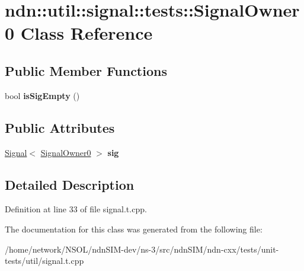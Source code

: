 \hypertarget{classndn_1_1util_1_1signal_1_1tests_1_1SignalOwner0}{}\section{ndn\+:\+:util\+:\+:signal\+:\+:tests\+:\+:Signal\+Owner0 Class Reference}
\label{classndn_1_1util_1_1signal_1_1tests_1_1SignalOwner0}
\subsection*{Public Member Functions}
\begin{DoxyCompactItemize}
\item 
bool {\bfseries is\+Sig\+Empty} ()\hypertarget{classndn_1_1util_1_1signal_1_1tests_1_1SignalOwner0_a130d53832145802ab6fde4f255c1432b}{}\label{classndn_1_1util_1_1signal_1_1tests_1_1SignalOwner0_a130d53832145802ab6fde4f255c1432b}

\end{DoxyCompactItemize}
\subsection*{Public Attributes}
\begin{DoxyCompactItemize}
\item 
\hyperlink{classndn_1_1util_1_1signal_1_1Signal}{Signal}$<$ \hyperlink{classndn_1_1util_1_1signal_1_1tests_1_1SignalOwner0}{Signal\+Owner0} $>$ {\bfseries sig}\hypertarget{classndn_1_1util_1_1signal_1_1tests_1_1SignalOwner0_a7f8ac18bd09747e02c60cc4909207899}{}\label{classndn_1_1util_1_1signal_1_1tests_1_1SignalOwner0_a7f8ac18bd09747e02c60cc4909207899}

\end{DoxyCompactItemize}


\subsection{Detailed Description}


Definition at line 33 of file signal.\+t.\+cpp.



The documentation for this class was generated from the following file\+:\begin{DoxyCompactItemize}
\item 
/home/network/\+N\+S\+O\+L/ndn\+S\+I\+M-\/dev/ns-\/3/src/ndn\+S\+I\+M/ndn-\/cxx/tests/unit-\/tests/util/signal.\+t.\+cpp\end{DoxyCompactItemize}
